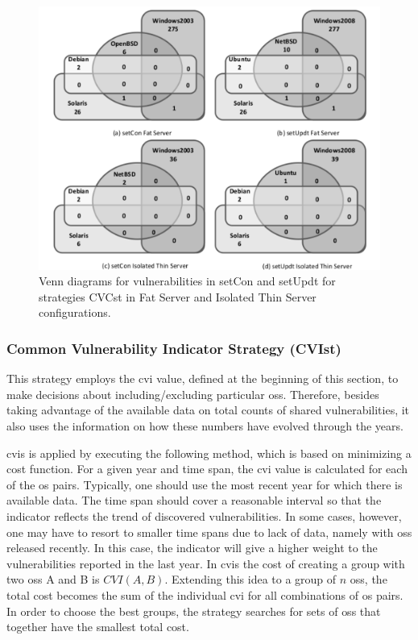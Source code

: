 \begin{figure}[!ht]
 \centering
 \includegraphics[scale=0.7]{images/images/grayscale_ven_dia_one_fig_update_a.pdf}
 \caption{Venn diagrams for vulnerabilities in setCon and setUpdt for strategies CVCst in Fat Server and Isolated Thin Server configurations.}
 \label{fig-venn_a}
\end{figure}


\subsubsection*{Common Vulnerability Indicator Strategy (CVIst)} 
This strategy employs the \gls{cvi} value, defined at the beginning of this section, to make decisions about including/excluding particular \glspl{os}.
Therefore, besides taking advantage of the available data on total counts of shared vulnerabilities, it also uses the information on how these numbers have evolved through the years.

\gls{cvis} is applied by executing the following method, which is based on minimizing a cost function. 
For a given year and time span, the \gls{cvi} value is calculated for each of the \gls{os} pairs. 
Typically, one should use the most recent year for which there is available data. 
The time span should cover a reasonable interval so that the indicator reflects the trend of discovered vulnerabilities. 
In some cases, however, one may have to resort to smaller time spans due to lack of data, namely with \glspl{os} released recently. 
In this case, the indicator will give a higher weight to the vulnerabilities reported in the last year. 
In \gls{cvis} the cost of creating a group with two \glspl{os} A and B is $\mathit{CVI}(A,B)$. 
Extending this idea to a group of $n$ \glspl{os}, the total cost becomes the sum of the individual \gls{cvi} for all combinations of \gls{os} pairs.
In order to choose the best groups, the strategy searches for sets of \glspl{os} that together have the smallest total cost.


